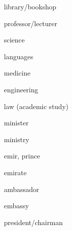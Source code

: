 \documentclass[avery5371,grid,frame]{flashcards}
\begin{document}
\begin{flashcard}{\LARGE library/bookshop}
\LARGE {}
\end{flashcard}
\begin{flashcard}{\LARGE professor/lecturer}
\LARGE {}
\end{flashcard}
\begin{flashcard}{\LARGE science}
\LARGE {}
\end{flashcard}
\begin{flashcard}{\LARGE languages}
\LARGE {}
\end{flashcard}
\begin{flashcard}{\LARGE medicine}
\LARGE {}
\end{flashcard}
\begin{flashcard}{\LARGE engineering}
\LARGE {}
\end{flashcard}
\begin{flashcard}{\LARGE law (academic study)}
\LARGE {}
\end{flashcard}
\begin{flashcard}{\LARGE minister}
\LARGE {}
\end{flashcard}
\begin{flashcard}{\LARGE ministry}
\LARGE {}
\end{flashcard}
\begin{flashcard}{\LARGE emir, prince}
\LARGE {}
\end{flashcard}
\begin{flashcard}{\LARGE emirate}
\LARGE {}
\end{flashcard}
\begin{flashcard}{\LARGE ambassador}
\LARGE {}
\end{flashcard}
\begin{flashcard}{\LARGE embassy}
\LARGE {}
\end{flashcard}
\begin{flashcard}{\LARGE president/chairman}
\LARGE {}
\end{flashcard}
\end{document}
